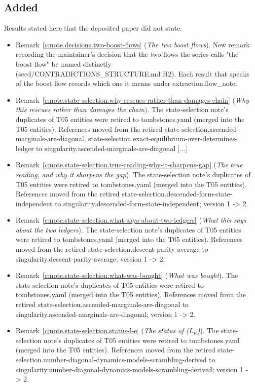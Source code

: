 \documentclass[11pt]{article}
\theoremstyle{definition}
\theoremstyle{plain}
\begin{document}
\subsection*{Added}
Results stated here that the deposited paper did not state.
\begin{itemize}\setlength{\itemsep}{2pt}
\item Remark~\ref{c:note.decisions.two-boost-flows} (\emph{The two boost flows}). New remark recording the maintainer's decision that the two flows the series calls "the boost flow" be named distinctly (seed/CONTRADICTIONS\_STRUCTURE.md H2). Each result that speaks of the boost flow records which one it means under extraction.flow\_note.
\item Remark~\ref{c:note.state-selection.why-rescues-rather-than-damages-chain} (\emph{Why this rescues rather than damages the chain}). The state-selection note's duplicates of T05 entities were retired to tombstones.yaml (merged into the T05 entities). References moved from the retired state-selection.ascended-marginals-are-diagonal, state-selection.exact-equilibrium-over-determines-ledger to singularity.ascended-marginals-are-diagonal [...]
\item Remark~\ref{c:note.state-selection.true-reading-why-it-sharpens-gap} (\emph{The true reading, and why it sharpens the gap}). The state-selection note's duplicates of T05 entities were retired to tombstones.yaml (merged into the T05 entities). References moved from the retired state-selection.descended-form-state-independent to singularity.descended-form-state-independent; version 1 -> 2.
\item Remark~\ref{c:note.state-selection.what-says-about-two-ledgers} (\emph{What this says about the two ledgers}). The state-selection note's duplicates of T05 entities were retired to tombstones.yaml (merged into the T05 entities). References moved from the retired state-selection.descent-parity-average to singularity.descent-parity-average; version 1 -> 2.
\item Remark~\ref{c:note.state-selection.what-was-bought} (\emph{What was bought}). The state-selection note's duplicates of T05 entities were retired to tombstones.yaml (merged into the T05 entities). References moved from the retired state-selection.ascended-marginals-are-diagonal to singularity.ascended-marginals-are-diagonal; version 1 -> 2.
\item Remark~\ref{c:note.state-selection.status-l-e} (\emph{The status of (L$_E$)}). The state-selection note's duplicates of T05 entities were retired to tombstones.yaml (merged into the T05 entities). References moved from the retired state-selection.number-diagonal-dynamics-models-scrambling-derived to singularity.number-diagonal-dynamics-models-scrambling-derived; version 1 -> 2.
\end{itemize}
\end{document}
